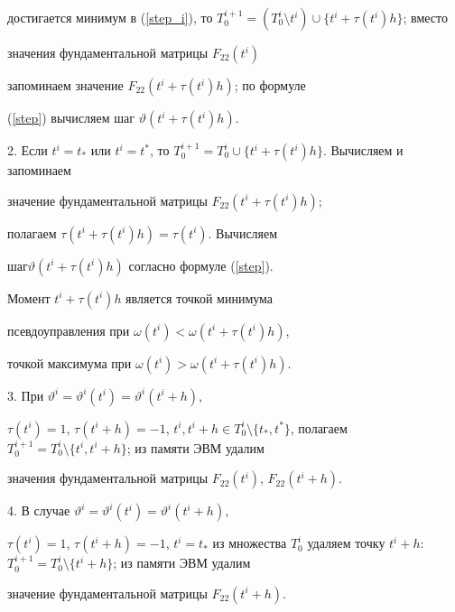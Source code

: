 достигается минимум в (\ref{step_i}), то $T_0^{i+1} =


(T_0^i \setminus t^i) \cup \{ t^i + \tau(t^i)h \}$; вместо


значения фундаментальной матрицы $F_{22}(t^i)$


запоминаем значение $F_{22}(t^i+\tau(t^i)h)$; по формуле


(\ref{step}) вычисляем шаг $\vartheta(t^i+\tau(t^i)h)$.





2. Если $t^i = t_*$ или $t^i = t^*$, то $T_0^{i+1} = T_0^i \cup


\{t^i+\tau(t^i)h\}$. Вычисляем и запоминаем


значение фундаментальной матрицы $F_{22}(t^i+\tau(t^i)h)$;


полагаем $\tau(t^i+\tau(t^i)h) = \tau(t^i)$. Вычисляем


шаг\linebreak $\vartheta(t^i+\tau(t^i)h)$ согласно формуле (\ref{step}).


Момент $t^i+\tau(t^i)h$ является точкой минимума


псевдоуправления при $\omega(t^i) < \omega(t^i+\tau(t^i)h)$,


точкой максимума при $\omega(t^i) >


\omega(t^i+\tau(t^i)h)$.





3. При $\vartheta^i = \vartheta^i(t^i) = \vartheta^i(t^i+h)$,


$\tau(t^i) = 1$, $\tau(t^i+h) = -1$, $t^i, t^i+h


\in T_0^i \setminus \{t_*,t^*\}$, полагаем $T_0^{i+1} = T_0^i


\setminus \{t^i,t^i+h\}$; из памяти ЭВМ удалим


значения фундаментальной матрицы $F_{22}(t^i)$, $F_{22}(t^i+h)$.





4. В случае $\vartheta^i = \vartheta^i(t^i) = \vartheta^i(t^i+h)$,


$\tau(t^i) = 1$, $\tau(t^i+h) = -1$, $t^i =


t_*$ из множества $T_0^i$ удаляем точку $t^i+h$: $T_0^{i+1} =


T_0^i \setminus \{t^i+h\}$; из памяти ЭВМ удалим


значение фундаментальной матрицы $F_{22}(t^i+h)$.





